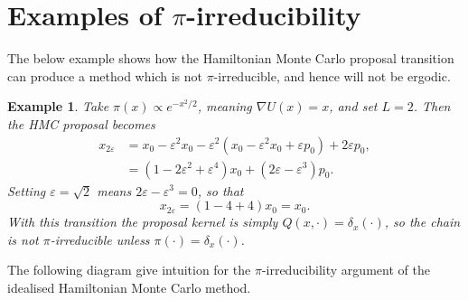 \documentclass[bj,numbers,noshowframe]{imsart}
\newcommand{\e}{\varepsilon}
\theoremstyle{definition}
\theoremstyle{plain}
\newtheorem{ex}[defn]{Example}
\theoremstyle{definition}
\begin{document}





\appendix


\section{Examples of $\pi$-irreducibility}

The below example shows how the Hamiltonian Monte Carlo proposal transition can produce a method which is not $\pi$-irreducible, and hence will not be ergodic.

\begin{ex}  \label{ex:irr}
Take $\pi(x) \propto e^{-x^2/2}$, meaning $\nabla U(x) = x$, and set $L = 2$.  Then the HMC proposal becomes
\begin{align*}
x_{2\e} 
&= x_0 - \e^2 x_0 - \e^2 (x_0 - \e^2 x_0 + \e p_0) + 2\e p_0, \\
&= (1 - 2\e^2 + \e^4)x_0 + (2\e - \e^3)p_0.
\end{align*}
Setting $\e = \sqrt{2}$ means $2\e - \e^3 = 0$, so that
\[
x_{2\e} = (1 - 4 + 4)x_0 = x_0.
\]
With this transition the proposal kernel is simply $Q(x,\cdot) = \delta_x(\cdot)$, so the chain is not $\pi$-irreducible unless $\pi(\cdot) = \delta_x(\cdot)$.
\end{ex}

The following diagram give intuition for the $\pi$-irreducibility argument of the idealised Hamiltonian Monte Carlo method.
\end{document}
